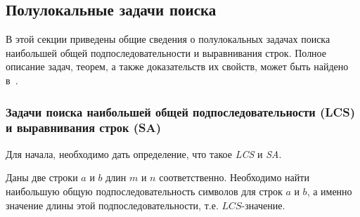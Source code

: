 



\subsection{Полулокальные задачи поиска}

В этой секции приведены общие сведения о полулокальных задачах поиска наибольшей общей подпоследовательности и выравнивания строк.
Полное описание задач, теорем, а также доказательств их свойств, может быть найдено в~\cite{alex2007semilocal}.

\subsubsection{Задачи поиска наибольшей общей подпоследовательности (LCS) и выравнивания строк (SA)}\mbox{}

Для начала, необходимо дать определение, что такое \emph{LCS} и \emph{SA}.

\begin{definition}
Даны две строки $a$ и $b$ длин $m$ и $n$ соответственно.
Необходимо найти наибольшую общую подпоследовательность символов для строк $a$ и $b$, а именно значение длины этой подпоследовательности, т.е. $LCS$-значение.
\end{definition}


